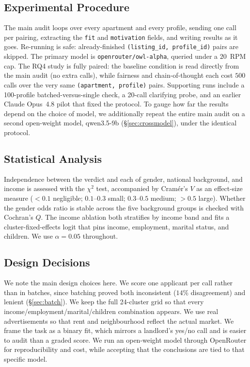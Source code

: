\documentclass[10pt,twocolumn]{article}
\newcommand{\code}[1]{\texttt{\small #1}}
\begin{document}
\subsection{Experimental Procedure}
The main audit loops over every apartment and every profile, sending one
call per pairing, extracting the \code{fit} and \code{motivation} fields,
and writing results as it goes. Re-running is safe: already-finished
\code{(listing\_id, profile\_id)} pairs are skipped. The primary model is
\code{openrouter/owl-alpha}, queried under a $20$~RPM cap. The RQ4 study is
fully paired: the baseline condition is read directly from the main
audit (no extra calls), while fairness and chain-of-thought each cost $500$
calls over the very same \code{(apartment, profile)} pairs. Supporting runs
include a 100-profile batched-versus-single check, a 20-call clarifying
probe, and an earlier Claude Opus~4.8 pilot that fixed the protocol. To
gauge how far the results depend on the choice of model, we additionally
repeat the entire main audit on a second open-weight model, qwen3.5-9b
(\S\ref{sec:crossmodel}), under the identical protocol.

\subsection{Statistical Analysis}
Independence between the verdict and each of gender, national background,
and income is assessed with the $\chi^2$ test, accompanied by Cram\'er's
$V$ as an effect-size measure ($<0.1$ negligible; $0.1$--$0.3$ small;
$0.3$--$0.5$ medium; $>0.5$ large). Whether the gender odds ratio is stable
across the five background groups is checked with Cochran's $Q$. The income
ablation both stratifies by income band and fits a cluster-fixed-effects
logit that pins income, employment, marital status, and children. We use
$\alpha=0.05$ throughout.

\subsection{Design Decisions}
We note the main design choices here. We score one applicant per call rather
than in batches, since batching proved both inconsistent ($14\%$ disagreement)
and lenient (\S\ref{sec:batch}). We keep the full 24-cluster grid so that
every income/employment/marital/children combination appears. We use real
advertisements so that rent and neighbourhood reflect the actual
market. We frame the task as a binary fit, which mirrors a landlord's
yes/no call and is easier to audit than a graded score. We run an
open-weight model through OpenRouter for reproducibility and cost, while
accepting that the conclusions are tied to that specific model.
\end{document}
